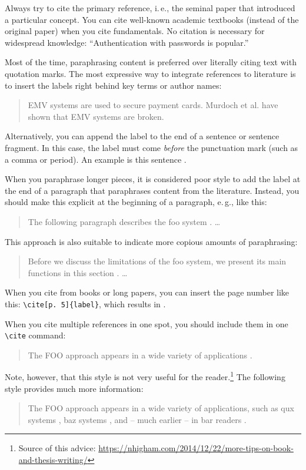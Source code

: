 Always try to cite the primary reference, i.\,e., the seminal paper that introduced a particular concept. You can cite well-known academic textbooks (instead of the original paper) when you cite fundamentals. No citation is necessary for widespread knowledge: ``Authentication with passwords is popular.''

Most of the time, paraphrasing content is preferred over literally citing text with quotation marks. The most expressive way to integrate references to literature is to insert the labels right behind key terms or author names:
\begin{quote}
  EMV systems \cite{anderson_ross_emv:_2014} are used to secure payment cards. Murdoch et al. \cite{murdoch_steven_j._chip_2010} have shown that EMV systems are broken.
\end{quote}

Alternatively, you can append the label to the end of a sentence or sentence fragment. In this case, the label must come \emph{before} the punctuation mark (such as a comma or period). An example is this sentence \cite{Hintz02}.

When you paraphrase longer pieces, it is considered poor style to add the label at the end of a paragraph that paraphrases content from the literature. Instead, you should make this explicit at the beginning of a paragraph, e.\,g., like this:
\begin{quote}
  The following paragraph describes the foo system \cite{kou_weidong_secure_2003}. …
\end{quote}

This approach is also suitable to indicate more copious amounts of paraphrasing:
\begin{quote}
  Before we discuss the limitations of the foo system, we present its main functions in this section \cite{kou_weidong_secure_2003}. …
\end{quote}

When you cite from books or long papers, you can insert the page number like this: \verb|\cite[p. 5]{label}|, which results in \cite[p. 5]{kou_weidong_secure_2003}.

When you cite multiple references in one spot, you should include them in one \verb|\cite| command:
\begin{quote}
  The FOO approach appears in a wide variety of applications \cite{murdoch_steven_j._chip_2010,anderson_ross_emv:_2014,kou_weidong_secure_2003}.
\end{quote}

Note, however, that this style is not very useful for the reader.\footnote{Source of this advice: \url{https://nhigham.com/2014/12/22/more-tips-on-book-and-thesis-writing/}} The following style provides much more information:
\begin{quote}
The FOO approach appears in a wide variety of applications, such as qux systems \cite{murdoch_steven_j._chip_2010}, baz systems \cite{anderson_ross_emv:_2014}, and -- much earlier -- in bar readers \cite{kou_weidong_secure_2003}.
\end{quote}

